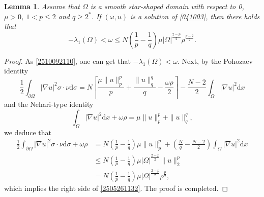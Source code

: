 \documentclass[10pt]{article}
\numberwithin{equation}{section}
\newtheorem{lemma}[theorem]{Lemma}
\newcommand{\ud}{\mathrm{d}}
\numberwithin{equation}{section}
\begin{document}
\begin{lemma}\label{2410040137}
Assume that $\Omega$ is a smooth star-shaped domain with respect to 0, $\mu>0$, $1<p\le 2$ and $q\ge 2^*$. If $(\omega, u)$ is a solution of \eqref{041003}, then there holds that
\begin{equation}\label{2505261132}
-\lambda_1(\Omega)< \omega\le N\left(\frac{1}{p}-\frac{1}{q}\right)\mu|\Omega|^{\frac{2-p}{2}}\rho^{\frac{p-2}{2}}.
\end{equation}
\end{lemma}
\begin{proof}
As \eqref{2510092110}, one can get that $-\lambda_1(\Omega)<\omega$. Next, by the Pohozaev identity
\begin{equation}\label{2505261102}
\frac12\int_{\partial \Omega}|\nabla u|^2\sigma\cdot \nu \ud\sigma=N\left[\frac{\mu\|u\|_p^p}{p}+\frac{\|u\|_{q}^{q}}{q}-\frac{\omega\rho}{2}\right]-\frac{N-2}{2}\int_{\Omega}|\nabla u|^2 \ud x
\end{equation}
and the Nehari-type identity
\begin{equation}\label{2505261103}
\int_{\Omega}|\nabla u|^2 \ud x+\omega\rho=\mu\|u\|_{p}^p+\|u\|_{q}^{q},
\end{equation}
we deduce  that
\[
\begin{aligned}
\frac12\int_{\partial \Omega}|\nabla u|^2\sigma\cdot \nu \ud\sigma+\omega\rho&=N\left(\frac{1}{p}-\frac{1}{q}\right)\mu\|u\|_p^p+\left(\frac{N}{q}-\frac{N-2}{2}\right)\int_{\Omega}|\nabla u|^2 \ud x\\
&\le N\left(\frac{1}{p}-\frac{1}{q}\right)\mu|\Omega|^{\frac{2-p}{2}}\|u\|_2^p\\
&=N\left(\frac{1}{p}-\frac{1}{q}\right)\mu|\Omega|^{\frac{2-p}{2}}\rho^{\frac{p}{2}},
\end{aligned}
\]
which implies the right side of \eqref{2505261132}. The proof is completed.
\end{proof}
\end{document}
